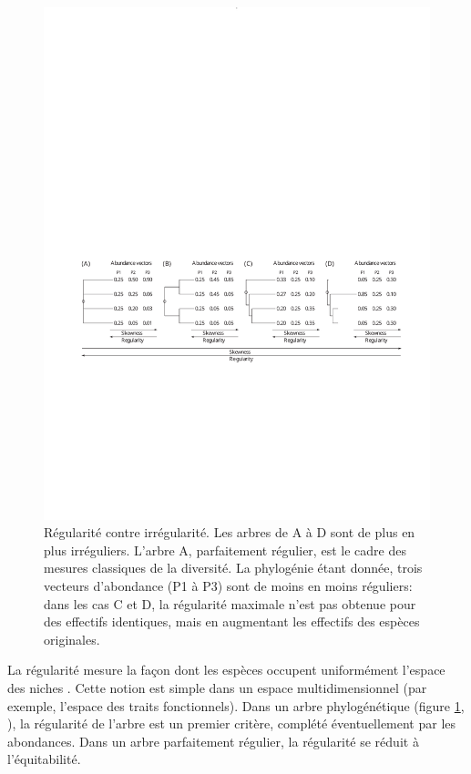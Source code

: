 \documentclass[
  11pt,
  french,
  a4paper,
  extrafontsizes,onecolumn,openright
  ]{memoir}
\newlength{\rf}
\begin{document}
\begin{figure}

{\centering \includegraphics[width=0.8\linewidth]{images/Pavoine2011} 

}

\caption{Régularité contre irrégularité. Les arbres de A à D sont de plus en plus irréguliers. L'arbre A, parfaitement régulier, est le cadre des mesures classiques de la diversité. La phylogénie étant donnée, trois vecteurs d'abondance (P1 à P3) sont de moins en moins réguliers: dans les cas C et D, la régularité maximale n'est pas obtenue pour des effectifs identiques, mais en augmentant les effectifs des espèces originales.}\label{fig:Pavoine2011}
\end{figure}

\normalsize

La régularité mesure la façon dont les espèces occupent uniformément l'espace des niches \autocite{Pavoine2011}.
Cette notion est simple dans un espace multidimensionnel (par exemple, l'espace des traits fonctionnels).
Dans un arbre phylogénétique (figure \ref{fig:Pavoine2011}, \textcite{Pavoine2011}), la régularité de l'arbre \autocite{Mooers1997} est un premier critère, complété éventuellement par les abondances.
Dans un arbre parfaitement régulier, la régularité se réduit à l'équitabilité.
\end{document}
